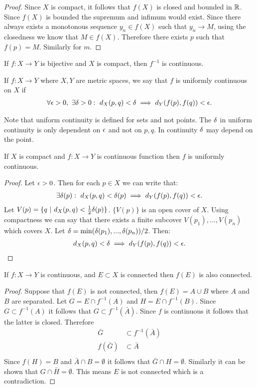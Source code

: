 \begin{proof}
  Since $X$ is compact, it follows that $f(X)$ is closed and bounded in $\mathbb{R}$. Since $f(X)$ is bounded the supremum and infimum would exist. Since there always exists a monotonous sequence $y_n \in f(X)$ such that $y_n \to M$, using the closedness we know that $M\in f(X)$. Therefore there exists $p$ such that $f(p) =M$. Similarly for $m$.
\end{proof}
\begin{proposition}
  If $f:X\to Y$ is bijective and $X$ is compact, then $f^{-1}$ is continuous.
\end{proposition}
\begin{definition}
  If $f:X\to Y$ where $X,Y$ are metric spaces, we say that $f$ is uniformly continuous on $X$ if
  \begin{align*}
    \forall\epsilon>0,\ \exists\delta>0:\ d_X(p,q) < \delta \implies d_Y(f(p),f(q)) <\epsilon.
  \end{align*}
\end{definition}
\begin{remark}
  Note that uniform continuity is defined for sets and not points. The $\delta$ in uniform continuity is only dependent on $\epsilon$ and not on $p,q$. In continuity $\delta$ may depend on the point.
\end{remark}
\begin{theorem}
  If $X$ is compact and $f:X\to Y$ is continuous function then $f$ is uniformly continuous.
\end{theorem}
\begin{proof}
  Let $\epsilon>0$. Then for each $p\in X$ we can write that:
  \begin{align*}
    \exists \delta(p):\ d_X(p,q) < \delta(p) \implies d_Y(f(p),f(q)) <\epsilon.
  \end{align*}
  Let $V(p) = \{q\ |\ d_X(p,q) < \f{1}{2}\d(p)\}$. $\{V(p)\}$ is an open cover of $X$. Using compactness we can say that there exists a finite subcover $V(p_1),...,V(p_n)$ which covers $X$. Let $\delta = \min(\delta(p_1),...,\delta(p_n))/2$. Then:
  \begin{align*}
    d_X(p,q) < \delta \implies d_Y(f(p), f(q)) <\epsilon.
  \end{align*}
\end{proof}
\begin{proposition}
  If $f:X\to Y$ is continuous, and $E\subset X$ is connected then $f(E)$ is also connected.
\end{proposition}
\begin{proof}
  Suppose that $f(E)$ is not connected, then $f(E) = A\cup B$ where $A$ and $B$ are separated. Let $G = E\cap f^{-1}(A)$ and $H = E\cap f^{-1}(B)$. Since $G\subset f^{-1}(A)$ it follows that $G\subset f^{-1}(\bar{A})$. Since $f$ is continuous it follows that the latter is closed. Therefore
  \begin{align*}
    \bar{G} &\subset f^{-1}(\bar{A})\\
    f(\bar{G}) &\subset \bar{A}\\
  \end{align*}
  Since $f(H) = B$ and $\bar{A}\cap B = \emptyset$ it follows that $\bar{G}\cap H = \emptyset$. Similarly it can be shown that $G\cap \bar{H} = \emptyset$. This means $E$ is not connected which is a contradiction.
\end{proof}
